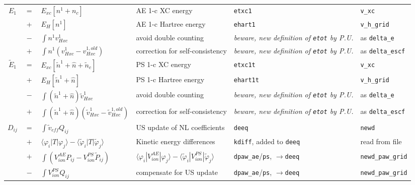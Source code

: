 \documentclass[a4paper,twocolumn,12pt]{article}
\newcommand{\var}[1]{{\tt #1}}
\renewcommand{\phi}{\varphi}
\begin{document}
\begin{table*}
\begin{small}
\begin{tabular}{|c@{}c@{}l|p{4.5cm}|p{4.5cm}|p{4.0cm}|}
%
%
\hline $E_1$ &$=$& $E_{xc}[n^1+n_c]$ & AE 1-c XC energy & \var{etxc1} & \var{v\_xc} \\
%
$ $ &+& $E_{H}[n^1]$ & AE 1-c Hartree energy & \var{ehart1} & \var{v\_h\_grid} \\
%
$ $ &$-$& $\int{n^1 v_{Hxc}^{1}}$ & avoid double counting & {\em beware, new definition of \var{etot} by P.U.}& as \var{delta\_e} \\
%
$ $ &$+$& $\int{n^1 (v_{Hxc}^{1}-v_{Hxc}^{1,old})}$ & correction for self-consistency & {\em beware, new definition of \var{etot} by P.U.} & as \var{delta\_escf} \\
%
%
\hline $\tilde{E}_1$ &$=$& $E_{xc}[\tilde{n}^1+\hat{n}+\tilde{n}_c]$ & PS 1-c XC energy & \var{etxc1t} & \var{v\_xc} \\
%
$ $ &+& $E_{H}[\tilde{n}^1+\hat{n}]$ & PS 1-c Hartree energy & \var{ehart1t} & \var{v\_h\_grid} \\
%
$ $ &$-$& $\int{(\tilde{n}^1+\hat{n}) \tilde{v}_{Hxc}^{1}}$ & avoid double counting & {\em beware, new definition of \var{etot} by P.U.}& as \var{delta\_e} \\
%
$ $ &$+$& $\int{(\tilde{n}^1+\hat{n}) (\tilde{v}_{Hxc}^{1}-\tilde{v}_{Hxc}^{1,old})}$ & correction for self-consistency & {\em beware, new definition of \var{etot} by P.U.}& as \var{delta\_escf} \\
%
%
\hline $D_{ij}$ &$=$& $\int{\tilde{v}_{eff}Q_{ij}}$ & US update of NL coefficients & \var{deeq} & \var{newd} \\
%
$ $ &$+$& $\langle\phi_i|T|\phi_j\rangle-\langle\tilde{\phi}_i|T|\tilde{\phi}_j\rangle$ & Kinetic energy differences & \var{kdiff}, added to \var{deeq} & read from file \\
%
$ $ &$+$& $\int(V^{AE}_{ion}P_{ij}-V^{PS}_{ion}\tilde{P}_{ij})$ & $\langle\phi_i|V^{AE}_{ion}|\phi_j\rangle-\langle\tilde{\phi}_i|V^{PS}_{ion}|\tilde{\phi}_j\rangle$ & \var{dpaw\_ae}/\var{ps}, $\rightarrow$\var{deeq} & \var{newd\_paw\_grid}\\
%
$ $ &$-$& $\int{V^{PS}_{ion}Q_{ij}}$ & compensate for US update & \var{dpaw\_ae}/\var{ps}, $\rightarrow$\var{deeq} & \var{newd\_paw\_grid}\\

\end{tabular}
\end{small}
\end{table*}
\end{document}
